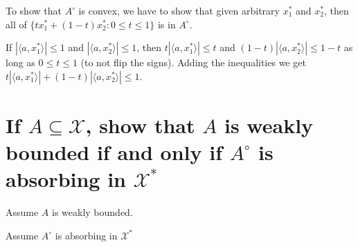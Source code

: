 \documentclass{article}
\begin{document}
To show that $A^{\circ}$ is convex, we have to show that given arbitrary $x_1^*$ and $x_2^*$, then all of $\{t x_1^* + (1-t) x_2^* :0\le t \le 1\}$ is in $A^{\circ}$.

If $|\langle a, x_1^*\rangle | \le 1$ and $|\langle a, x_2^*\rangle | \le 1$, then $t|\langle a, x_1^*\rangle | \le t$ and $(1-t)|\langle a, x_2^*\rangle | \le 1-t$ as long as $0 \le t \le 1$ (to not flip the signs). Adding the inequalities we get $t|\langle a, x_1^*\rangle | +(1-t)|\langle a, x_2^*\rangle | \le 1$.

\section{If $A\subseteq\mathscr{X}$, show that $A$ is weakly bounded if and only if $A^{\circ}$ is absorbing in $\mathscr{X}^*$}

Assume $A$ is weakly bounded. 

Assume $A^{\circ}$ is absorbing in $\mathscr{X}^*$
\end{document}
